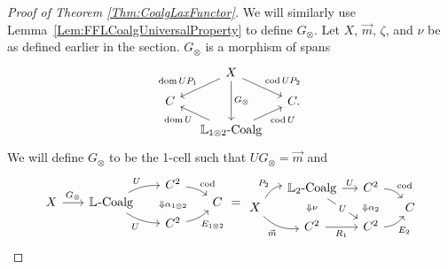 \begin{proof}[Proof of Theorem \ref{Thm:CoalgLaxFunctor}]
	We will similarly use Lemma~\ref{Lem:FFLCoalgUniversalProperty} to define $G_{\otimes}$. Let $X$, $\vec{m}$, $\zeta$, and $\nu$ be as defined earlier in the section. $G_{\otimes}$ is a morphism of spans
	\[
	\begin{tikzcd}[row sep=small,column sep=small]
		{} & X \dlar[swap]{\dom UP_1} \drar{\cod UP_2} \ar{dd}{G_{\otimes}} & \\
		C && C. \\
		& \LCoalg[1\otimes2] \ular{\dom U} \urar[swap]{\cod U}
	\end{tikzcd}
	\]
	We will define $G_{\otimes}$ to be the 1-cell such that $UG_{\otimes}=\vec{m}$ and
	\[
	\begin{tikzcd}[row sep=0ex, column sep=4ex, bend angle=15, baseline=(B.base)]
		{} && |[alias=domA]| C^2 \drar[bend left][]{\cod} & \\
		|[alias=B]| X \rar{G_{\otimes}} 
			& \LCoalg \urar[bend left][]{U} \drar[bend right][swap]{U} 
			&& C \\
		&& |[alias=codA]| C^2 \urar[bend right][swap]{E_{1\otimes2}}
		\twocellA{\alpha_{1\otimes2}}
	\end{tikzcd}
	=
	\begin{tikzcd}[bend angle=25, row sep=0ex, column sep=3ex]
		& |[alias=domA]| \LCoalg[2] \rar{U} \ar{ddr}[description]{U}
			& |[alias=domB]| C^2 \drar[bend left][]{\cod} & \\
		X \urar[bend left][]{P_2} \drar[bend right][swap]{\vec{m}}
			&&& C \\
		& |[alias=codA]| C^2 \rar[swap]{R_1}
			& |[alias=codB]| C^2 \urar[bend right][swap]{E_2} &
		\twocellA{\nu}
		\twocellB{\alpha_2}
	\end{tikzcd}
	\]
\end{proof}

